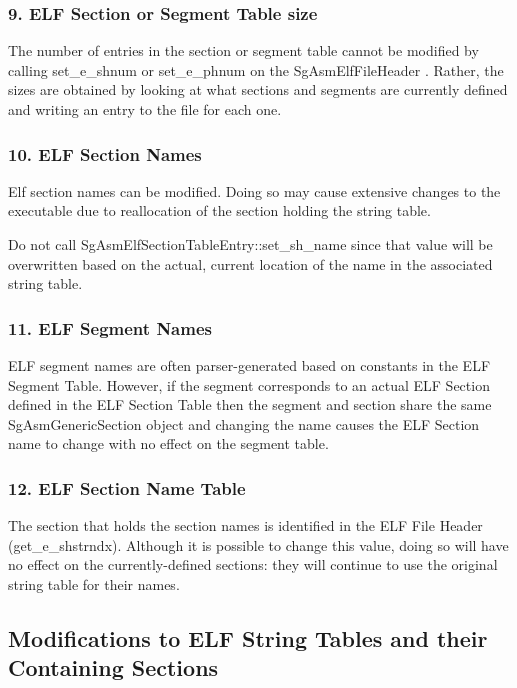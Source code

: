 \subsubsection{9. ELF Section or Segment Table size}

   The number of entries in the section or segment table cannot be modified by calling set\_e\_shnum or set\_e\_phnum on the
   SgAsmElfFileHeader . Rather, the sizes are obtained by looking at what sections and segments
   are currently defined and writing an entry to the file for each one.

\subsubsection{10. ELF Section Names}

   Elf section names can be modified. Doing so may cause extensive changes to the executable due to reallocation of the section
   holding the string table.

   Do not call SgAsmElfSectionTableEntry::set\_sh\_name since that value will be overwritten based on the actual, current
   location of the name in the associated string table.

\subsubsection{11. ELF Segment Names}

   ELF segment names are often parser-generated based on constants in the ELF Segment Table. However, if the segment
   corresponds to an actual ELF Section defined in the ELF Section Table then the segment and section share the same
   SgAsmGenericSection object and changing the name causes the ELF Section name to change with no effect on the segment table.

\subsubsection{12. ELF Section Name Table}

   The section that holds the section names is identified in the ELF File Header (get\_e\_shstrndx). Although it is possible to
   change this value, doing so will have no effect on the currently-defined sections: they will continue to use the original
   string table for their names.

\subsection{Modifications to ELF String Tables and their Containing Sections}

